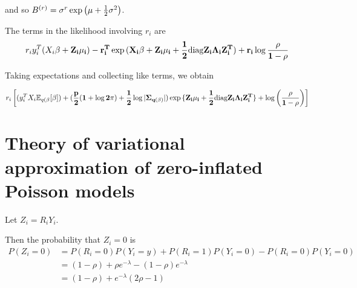 \documentclass{amsart}
\begin{document}
and so $B^{(r)} = \sigma^r \exp{\left( \mu + \frac{1}{2}\sigma^2\right)}$.

The terms in the likelihood involving $r_i$ are
$$
r_i y_i^T(X_i \bf \beta + Z_i \mu_i) - r_i^T \exp{(X_i \bf \beta+ Z_i \mu_i + \frac{1}{2}{\mbox{diag}}{Z_i \Lambda_i Z_i^T})} + r_i \log{\frac{\rho}{1 - \rho}}
$$

Taking expectations and collecting like terms, we obtain

$$
r_i \left [ (y_i^T X_i \mathbb{E}_{q(\bf \beta} [\bf \beta]) + (\frac{p}{2}(1 + \log{2 \pi}) + \frac{1}{2} \log{|\Sigma_{q(\bf \beta)}|})\exp{\{ Z_i \mu_i + \frac{1}{2}{\mbox{diag}}{Z_i \Lambda_i Z_i^T} \}} + \log{\left( \frac{\rho}{1 - \rho} \right)} \right ]
$$



\section{Theory of variational approximation of zero-inflated Poisson models}
Let $Z_i = R_i Y_i$.

Then the probability that $Z_i = 0$ is
\begin{align*}
P(Z_i = 0) &= P(R_i = 0)P(Y_i = y) + P(R_i = 1) P(Y_i = 0) - P(R_i = 0) P(Y_i = 0) \\
&= (1 - \rho) + \rho e^{-\lambda} - (1 - \rho) e^{-\lambda} \\
&= (1 - \rho) + e^{-\lambda}(2 \rho - 1)
\end{align*}





\end{document}
